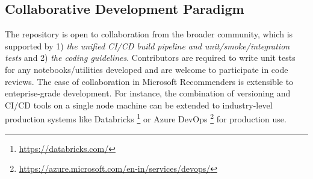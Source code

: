 \subsection{Collaborative Development Paradigm} %

The repository is open to collaboration from the broader community, which is supported by 
1) \textit{the unified CI/CD build pipeline and unit/smoke/integration tests} and  
2) \textit{the coding guidelines}. Contributors are required to write unit tests for any notebooks/utilities developed and 
are welcome to participate in code reviews.
The ease of collaboration in Microsoft Recommenders is extensible to enteprise-grade development. 
For instance, the combination of versioning and CI/CD tools on a single node machine can be extended to industry-level production systems like Databricks \footnote{\url{https://databricks.com/}} or Azure DevOps \footnote{\url{https://azure.microsoft.com/en-in/services/devops/}} for production use.